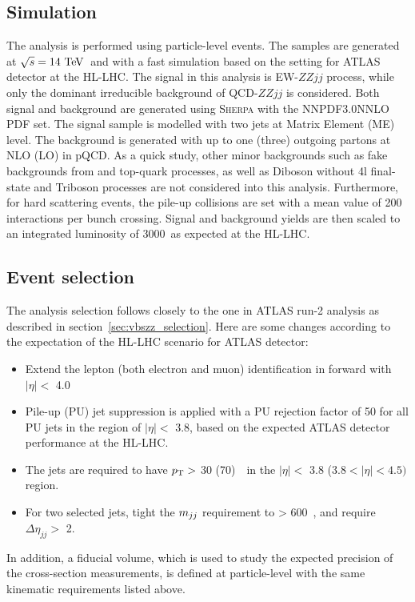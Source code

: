 \subsection{Simulation}

The analysis is performed using particle-level events.
The samples are generated at $\sqrt{s} = 14~\text{Te\kern -0.1em V}$~and with a fast simulation based on the setting for ATLAS detector at the HL-LHC.
The signal in this analysis is EW-$ZZjj$ process, while only the dominant irreducible background of QCD-$ZZjj$ is considered.
Both signal and background are generated using \textsc{Sherpa} with the NNPDF3.0NNLO PDF set.
The signal sample is modelled with two jets at Matrix Element (ME) level.
The background is generated with up to one (three) outgoing partons at NLO (LO) in pQCD.
As a quick study, other minor backgrounds such as fake backgrounds from \Zjet and top-quark processes, as well as Diboson without 4l final-state and Triboson processes are not considered into this analysis.
Furthermore, for hard scattering events, the pile-up collisions are set with a mean value of 200 interactions per bunch crossing.
Signal and background yields are then scaled to an integrated luminosity of 3000~\ifb as expected at the HL-LHC.

\subsection{Event selection}

The analysis selection follows closely to the one in ATLAS run-2 analysis as described in section~\ref{sec:vbszz_selection}.
Here are some changes according to the expectation of the HL-LHC scenario for ATLAS detector:
\begin{itemize}
	\item Extend the lepton (both electron and muon) identification in forward with $|\eta| <$ 4.0
	\item Pile-up (PU) jet suppression is applied with a PU rejection factor of 50 for all PU jets in the region of $|\eta| <$ 3.8, based on the expected ATLAS detector performance at the HL-LHC.
	\item The jets are required to have $p_{\text{T}} >$ 30 (70)~\gev~in the $|\eta| <$ 3.8 ($3.8 < |\eta| < 4.5)$ region.
	\item For two selected jets, tight the $m_{jj}$ requirement to > 600~\gev, and require $\Delta \eta_{jj} >$ 2.
\end{itemize}
In addition, a fiducial volume, which is used to study the expected precision of the cross-section measurements,
 is defined at particle-level with the same kinematic requirements listed above.


